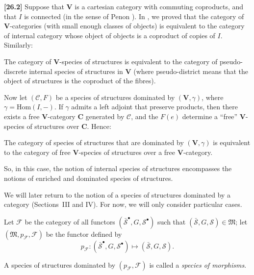 \documentclass[a4paper,fleqn]{article}
\theoremstyle{plain}
\newenvironment{proposition}[1]
  {\renewcommand\theinnerproposition{#1}\innerproposition}
  {\endinnerproposition}
\theoremstyle{definition}
\newenvironment{definition}[1]
  {\renewcommand\theinnerdefinition{#1}\innerdefinition}
  {\endinnerdefinition}
\newenvironment{longcomm}[1]
  {\noindent\textbf{[#1]}\rmfamily}
  {}
\newcommand{\CC}{\mathcal{C}}
\renewcommand{\SS}{\mathcal{S}}
\newcommand{\bSS}{\bar{\SS}}
\newcommand{\MM}{\mathfrak{M}}
\newcommand{\FF}{\mathcal{F}}
\newcommand{\Hom}{\mathrm{Hom}}
\begin{document}
\begin{longcomm}{26.2}
  Suppose that $\mathbf{V}$ is a cartesian category with commuting coproducts, and that $I$ is connected (in the sense of Penon \cite{comm83}).
  In \cite[Appendix]{coll120}, we proved that the category of $\mathbf{V}$-categories (with small enough classes of objects) is equivalent to the category of internal category whose object of objects is a coproduct of copies of $I$.
  Similarly:

  \begin{proposition}{A}
    The category of $\mathbf{V}$-species of structures is equivalent to the category of pseudo-discrete internal species of structures in $\mathbf{V}$ (where pseudo-district means that the object of structures is the coproduct of the fibres).
  \end{proposition}

  Now let $(\CC,F)$ be a species of structures dominated by $(\mathbf{V},\gamma)$, where $\gamma=\Hom(I,-)$.
  If $\gamma$ admits a left adjoint that preserve products, then there exists a free $\mathbf{V}$-category $\mathbf{C}$ generated by $\CC$, and the $F(e)$ determine a ``free'' $\mathbf{V}$-species of structures over $\mathbf{C}$.
  Hence:

  \begin{proposition}{B}
    The category of species of structures that are dominated by $(\mathbf{V},\gamma)$ is equivalent to the category of free $\mathbf{V}$-species of structures over a free $\mathbf{V}$-category.
  \end{proposition}

  So, in this case, the notion of internal species of structures encompasses the notions of enriched and dominated species of structures.
\end{longcomm}

We will later return to the notion of a species of structures dominated by a category (Sections~III and IV).
For now, we will only consider particular cases.

Let $\FF$ be the category of all functors $(\bSS^\bullet,G,\SS^\bullet)$ such that $(\bSS,G,\SS)\in\MM$;
let $(\MM,p_\FF,\FF)$ be the functor defined by
\[
  p_\FF\colon(\bSS^\bullet,G,\SS^\bullet)
  \longmapsto (\bSS,G,\SS).
\]

\begin{definition}{4}
\label{definition:i-4}
  A species of structures dominated by $(p_\FF,\FF)$ is called a \emph{species of morphisms}.
\end{definition}
\end{document}
